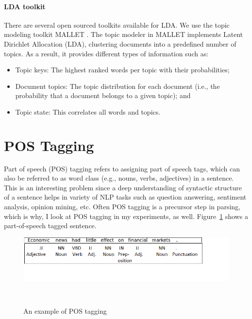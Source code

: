 \paragraph*{LDA toolkit}

There are several  open sourced toolkits available for LDA. We use the topic modeling toolkit MALLET \cite{McCallumMALLET}.  The
topic modeler in MALLET implements Latent Dirichlet Allocation (LDA), clustering
documents into a predefined number of topics. As a result, it provides
different types of information such as:

\begin{itemize}
	\item  Topic keys:  The highest ranked words per topic with their probabilities; 
	
	\item Document topics: The topic distribution for each document (i.e., the probability that a document belongs to a given topic); and 
	
	\item Topic state: This correlates all words and topics.
	
\end{itemize}

\section{POS Tagging}

Part of speech (POS) tagging refers to assigning part of speech tags, which can also be referred to as word class (e.g., nouns, verbs, adjectives) in a sentence. This is an interesting problem since a deep understanding of syntactic structure of a sentence helps in variety of NLP tasks such as question answering, sentiment analysis, opinion mining, etc. Often POS tagging is a precursor step in parsing, which is why, I look at POS tagging in my experiments, as well. Figure~\ref{fig:postag} shows a part-of-speech tagged sentence.

\begin{figure}[t]
    \centering
    \includegraphics[scale = 0.9]{figures/postagging.png}
    
    \caption{An example of POS tagging}~\label{fig:postag}
\end{figure}

